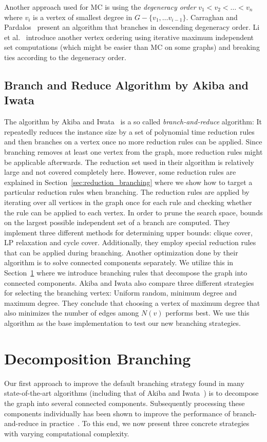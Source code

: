 \documentclass[a4paper,UKenglish,cleveref, autoref, thm-restate]{lipics-v2021}
\begin{document}
Another approach used for MC is using the \emph{degeneracy order} $v_1 < v_2 <
\dots < v_n$ where $v_i$ is a vertex of smallest degree in $G - \{v_1, \dots
v_{i-1}\}$. Carraghan and Pardalos~\cite{CarraghanPardalos} present an algorithm
that branches in descending degeneracy order. Li et al.~\cite{LiFangXu}
introduce another vertex ordering using iterative maximum independent set
computations (which might be easier than MC on some graphs) and breaking ties
according to the degeneracy order.

\subsection{Branch and Reduce Algorithm by Akiba and Iwata~\cite{AkibaIwata}}

The algorithm by Akiba and Iwata~\cite{AkibaIwata} is a so called
\emph{branch-and-reduce} algorithm: It repeatedly reduces the instance size by a
set of polynomial time reduction rules and then branches on a vertex once no
more reduction rules can be applied. Since branching removes at least one vertex
from the graph, more reduction rules might be applicable afterwards. The
reduction set used in their algorithm is relatively large and not covered
completely here. However, some reduction rules are explained in
Section~\ref{sec:reduction_branching} where we show how to target a particular reduction
rules when branching. The reduction rules are applied by iterating over all
vertices in the graph once for each rule and checking whether the rule
can be applied to each vertex. In order to prune the search space, bounds on the largest
possible independent set of a branch are computed. They implement three different
methods for determining upper bounds: clique cover, LP relaxation and cycle
cover. Additionally, they employ special reduction rules that can be applied
during branching. Another optimization done by their algorithm is to solve
connected components separately. We utilize this in
Section~\ref{sec:decomposition_branching} where we introduce branching rules
that decompose the graph into connected components. Akiba and Iwata also
compare three different strategies for
selecting the branching vertex: Uniform random, minimum degree and maximum
degree. They conclude that choosing a vertex of maximum degree that also
minimizes the number of edges among $N(v)$ performs best. We use this algorithm
as the base implementation to test our new branching strategies.

\section{Decomposition Branching}
\label{sec:decomposition_branching}
Our first approach to improve the default branching strategy found in many state-of-the-art algorithms (including that of Akiba and Iwata~\cite{AkibaIwata}) is to decompose the graph into several connected components.
Subsequently processing these components individually has been shown to improve the performance of branch-and-reduce in practice~\cite{alsahafy2020computing}.
To this end, we now present three concrete strategies with varying computational complexity.
\end{document}
